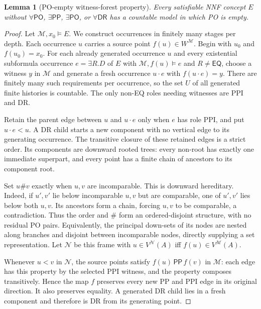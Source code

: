 \documentclass[11pt,letterpaper]{article}
\newcommand{\EQ}{\mathsf{EQ}}
\newcommand{\PP}{\mathsf{PP}}
\newcommand{\PO}{\mathsf{PO}}
\newcommand{\DR}{\mathsf{DR}}
\newtheorem{lemma}[theorem]{Lemma}
\theoremstyle{definition}
\theoremstyle{remark}
\begin{document}
\begin{lemma}[PO-empty witness-forest property]
\label{lem:forest}
Every satisfiable NNF concept $E$ without $\forall\PO$, $\exists\PP$,
$\exists\PO$, or $\forall\DR$ has a countable model in which PO is empty.
\end{lemma}
\begin{proof}
Let $\mathcal M,x_0\models E$. We construct occurrences in finitely
many stages per depth. Each occurrence $u$ carries a source point
$f(u)\in W^{\mathcal M}$. Begin with $u_0$ and $f(u_0)=x_0$.
For each already generated occurrence $u$ and every existential
subformula occurrence $e=\exists R.D$ of $E$ with
$\mathcal M,f(u)\models e$ and $R\neq\EQ$, choose a witness $y$ in
$\mathcal M$ and generate a fresh occurrence $u\cdot e$ with
$f(u\cdot e)=y$. There are finitely many such requirements per occurrence,
so the set $U$ of all generated finite histories is countable. The only
non-EQ roles needing witnesses are PPI and DR.

Retain the parent edge between $u$ and $u\cdot e$ only when $e$ has role
PPI, and put $u\cdot e<u$. A DR child starts a new component with no
vertical edge to its generating occurrence. The transitive closure of
these retained edges is a strict order. Its components are downward
rooted trees: every non-root has exactly one immediate superpart, and
every point has a finite chain of ancestors to its component root.

Set $u\#v$ exactly when $u,v$ are incomparable. This is downward
hereditary. Indeed, if $u',v'$ lie below incomparable $u,v$ but are
comparable, one of $u',v'$ lies below both $u,v$. Its ancestors form a
chain, forcing $u,v$ to be comparable, a contradiction. Thus the order
and $\#$ form an ordered-disjoint structure, with no residual PO pairs.
Equivalently, the principal down-sets of its nodes are nested along
branches and disjoint between incomparable nodes, directly supplying a
set representation. Let $\mathcal N$ be this frame with
$u\in V^{\mathcal N}(A)$ iff $f(u)\in V^{\mathcal M}(A)$.

Whenever $u<v$ in $\mathcal N$, the source points satisfy
$f(u)\,\PP\,f(v)$ in $\mathcal M$: each edge has this property by
the selected PPI witness, and the property composes transitively. Hence
the map $f$ preserves every new PP and PPI edge in its original direction.
It also preserves equality. A generated DR child lies in a fresh
component and therefore is DR from its generating point.


\end{proof}
\end{document}
